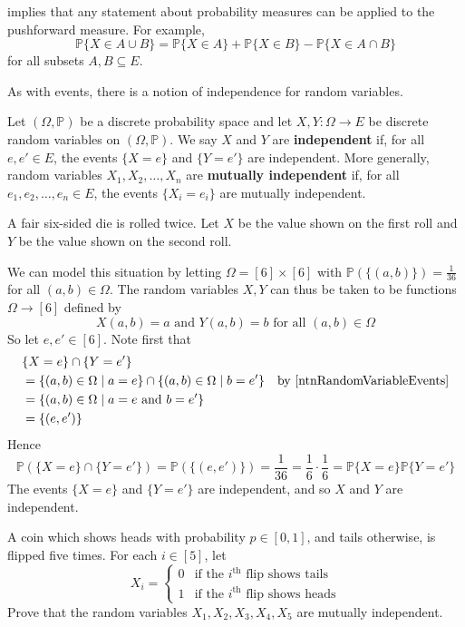 implies that any statement about probability measures can be applied to the pushforward measure. For example,
\[ \mathbb{P}\{X \in A \cup B\} = \mathbb{P}\{X \in A\} + \mathbb{P}\{X \in B\} - \mathbb{P}\{X \in A \cap B\} \]
for all subsets $A,B \subseteq E$.

As with events, there is a notion of independence for random variables.

\begin{definition}
\label{defIndependentRandomVariables}
Let $(\Omega,\mathbb{P})$ be a discrete probability space and let $X,Y : \Omega \to E$ be discrete random variables on $(\Omega,\mathbb{P})$. We say $X$ and $Y$ are \textbf{independent} if, for all $e,e' \in E$, the events $\{ X=e \}$ and $\{ Y=e' \}$ are independent. More generally, random variables $X_1,X_2,\dots,X_n$ are \textbf{mutually independent} if, for all $e_1,e_2,\dots,e_n \in E$, the events $\{ X_i = e_i \}$ are mutually independent.
\end{definition}

\begin{example}
A fair six-sided die is rolled twice. Let $X$ be the value shown on the first roll and $Y$ be the value shown on the second roll.

We can model this situation by letting $\Omega = [6] \times [6]$ with $\mathbb{P}(\{(a,b)\})=\frac{1}{36}$ for all $(a,b) \in \Omega$. The random variables $X,Y$ can thus be taken to be functions $\Omega \to [6]$ defined by
\[ X(a,b)=a \text{ and } Y(a,b)=b \text{ for all } (a,b) \in \Omega \]
So let $e,e' \in [6]$. Note first that
\begin{align*}
& \{ X = e \} \cap \{ Y = e' \} && \\
&= \{ (a,b) \in \Omega \mid a=e \} \cap \{ (a,b) \in \Omega \mid b=e' \} && \text{by \Cref{ntnRandomVariableEvents}} \\
&= \{ (a,b) \in \Omega \mid a=e \text{ and } b=e' \} && \\
&= \{ (e,e') \} &&
\end{align*}
Hence
\[ \mathbb{P}(\{ X = e \} \cap \{ Y = e' \}) = \mathbb{P}(\{(e,e')\}) = \frac{1}{36} = \frac{1}{6} \cdot \frac{1}{6} = \mathbb{P}\{X=e\}\mathbb{P}\{Y=e'\} \]
The events $\{ X = e \}$ and $\{ Y = e' \}$ are independent, and so $X$ and $Y$ are independent.
\end{example}

\begin{exercise}
A coin which shows heads with probability $p \in [0,1]$, and tails otherwise, is flipped five times. For each $i \in [5]$, let
\[ X_i = \begin{cases} 0 & \text{if the } i^{\text{th}} \text{ flip shows tails} \\
1 & \text{if the } i^{\text{th}} \text{ flip shows heads} \end{cases} \]
Prove that the random variables $X_1,X_2,X_3,X_4,X_5$ are mutually independent.
\end{exercise}

